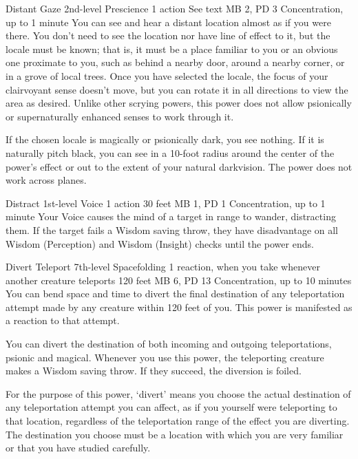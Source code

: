   \DndPowerHeader%
  {Distant Gaze}
  {2nd-level Prescience}
  {1 action}
  {See text}
  {MB 2, PD 3}
  {Concentration, up to 1 minute}
  You can see and hear a distant location
  almost as if you were there.
  You don't need to see the location
  nor have line of effect to it,
  but the locale must be known;
  that is, it must be
  a place familiar to you or an obvious one
  proximate to you,
  such as behind a nearby door,
  around a nearby corner,
  or in a grove of local trees.
  Once you have selected the locale,
  the focus of your clairvoyant sense doesn't move,
  but you can rotate it in all directions
  to view the area as desired.
  Unlike other scrying powers,
  this power does not allow psionically or supernaturally
  enhanced senses to work through it.

  If the chosen locale is magically or psionically dark,
  you see nothing.
  If it is naturally pitch black,
  you can see in a 10-foot radius around the center
  of the power's effect or out to the extent
  of your natural darkvision.
  The power does not work across planes.

\DndPowerHeader%
  {Distract}
  {1st-level Voice}
  {1 action}
  {30 feet}
  {MB 1, PD 1}
  {Concentration, up to 1 minute}
Your Voice causes the mind of a target in range to wander,
distracting them.
If the target fails a Wisdom saving throw,
they have disadvantage on all Wisdom (Perception)
and Wisdom (Insight) checks until the power ends.

\DndPowerHeader%
  {Divert Teleport}
  {7th-level Spacefolding}
  {1 reaction, when you take whenever another creature
  teleports}
  {120 feet}
  {MB 6, PD 13}
  {Concentration, up to 10 minutes}
  You can bend space and time to
  divert the final destination of any teleportation attempt
  made by any creature within 120 feet of you.
  This power is manifested as a reaction to that attempt.

  You can divert the destination of both incoming and outgoing
  teleportations,
  psionic and magical.
  Whenever you use this power,
  the teleporting creature makes a Wisdom saving throw.
  If they succeed, the diversion is foiled.
  
  For the purpose of this power,
  `divert' means you choose the actual destination
  of any teleportation attempt you can affect,
  as if you yourself were teleporting to that location,
  regardless of the teleportation range
  of the effect you are diverting.
  The destination you choose must be a location
  with which you are very familiar
  or that you have studied carefully.
  
